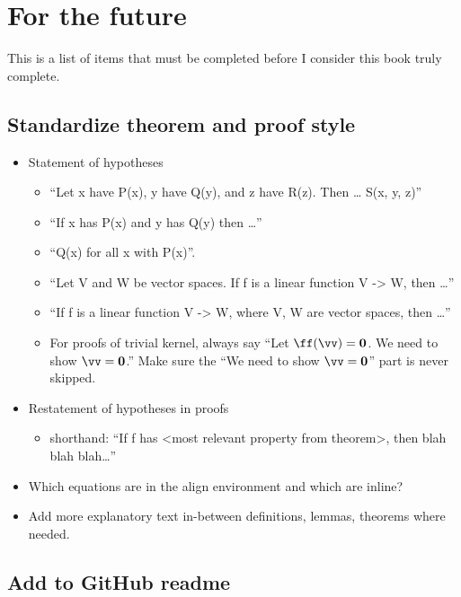 \chapter*{For the future}

This is a list of items that must be completed before I consider this book truly complete.

\section*{Standardize theorem and proof style}

\begin{itemize}
    \item Statement of hypotheses
    \begin{itemize}
        \item “Let x have P(x), y have Q(y), and z have R(z). Then … S(x, y, z)”
        \item “If x has P(x) and y has Q(y) then …”
        \item “Q(x) for all x with P(x)”.
        \item “Let V and W be vector spaces. If f is a linear function V -> W, then …”
        \item “If f is a linear function V -> W, where V, W are vector spaces, then …”
        \item For proofs of trivial kernel, always say ``Let $\ff(\vv) = \mathbf{0}$. We need to show $\vv = \mathbf{0}$.'' Make sure the ``We need to show $\vv = \mathbf{0}$'' part is never skipped.
    \end{itemize}
    \item Restatement of hypotheses in proofs
    \begin{itemize}
        \item shorthand: “If f has <most relevant property from theorem>, then blah blah blah…” 
    \end{itemize}
    \item Which equations are in the align environment and which are inline?
    \item Add more explanatory text in-between definitions, lemmas, theorems where needed.
\end{itemize}

\section*{Add to GitHub readme}

